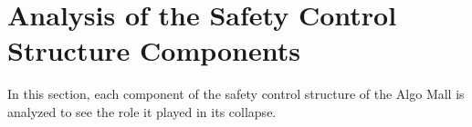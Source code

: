\documentclass[12pt]{article}
\begin{document}













\section{Analysis of the Safety Control Structure Components}

In this section, each component of the safety control structure of the Algo Mall is analyzed to see the role it played in its collapse.
\end{document}
